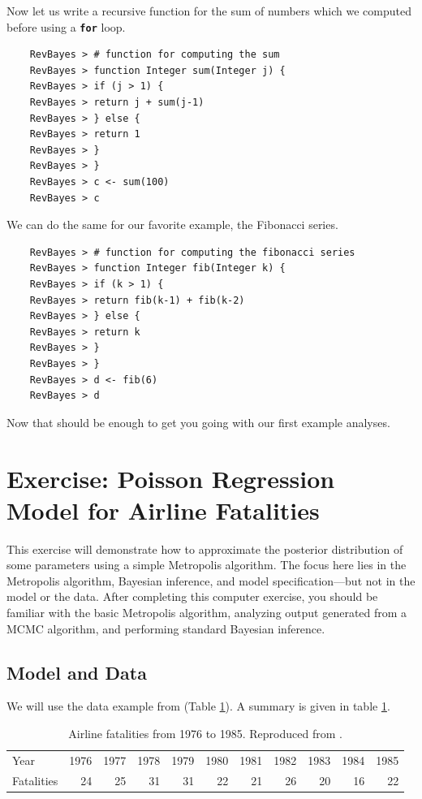 \documentclass[11pt]{article}
\newcommand{\cl}[1]{{\texttt{\textbf{#1}}}}
\begin{document}
Now let us write a recursive function for the sum of numbers which we computed before using a \cl{for} loop.
{\tt \begin{snugshade*}
\begin{lstlisting}    
    RevBayes > # function for computing the sum
    RevBayes > function Integer sum(Integer j) {
    RevBayes > if (j > 1) {
    RevBayes > return j + sum(j-1)
    RevBayes > } else {
    RevBayes > return 1
    RevBayes > }
    RevBayes > }
    RevBayes > c <- sum(100)
    RevBayes > c
\end{lstlisting}
\end{snugshade*}}
We can do the same for our favorite example, the Fibonacci series.
{\tt \begin{snugshade*}
\begin{lstlisting}    
    RevBayes > # function for computing the fibonacci series
    RevBayes > function Integer fib(Integer k) {
    RevBayes > if (k > 1) {
    RevBayes > return fib(k-1) + fib(k-2)
    RevBayes > } else {
    RevBayes > return k
    RevBayes > }
    RevBayes > }
    RevBayes > d <- fib(6)
    RevBayes > d
\end{lstlisting}
\end{snugshade*}}
Now that should be enough to get you going with our first example analyses.

\newpage
\FloatBarrier
\section{Exercise: Poisson Regression Model for Airline Fatalities}

This exercise will demonstrate how to approximate the posterior distribution of some parameters using a simple Metropolis algorithm. 
The focus here lies in the Metropolis algorithm, Bayesian inference, and model specification---but not in the model or the data. 
After completing this computer exercise, you should be familiar with the basic Metropolis algorithm, analyzing output generated from a MCMC algorithm, and performing standard Bayesian inference.

\subsection*{Model and Data}
We will use the data example from \cite{gelman95} (Table \ref{tab:airlineFatalities}). 
A summary is given in table \ref{tab:airlineFatalities}.
\begin{table}[!hbtp]
\caption{Airline fatalities from 1976 to 1985. Reproduced from \cite[][Table 2.2 on p. 69]{gelman95}.}
\label{tab:airlineFatalities}
\smallskip
\centering
\begin{tabular}{ l | r r r r r r r r r r }
  \hline                       
  Year & 1976 & 1977 & 1978 & 1979 & 1980 & 1981 & 1982 & 1983 & 1984 & 1985 \\
  Fatalities & 24 & 25 & 31 & 31 & 22 & 21 & 26 & 20 & 16 & 22\\
  \hline  
\end{tabular}
\end{table}
\end{document}
